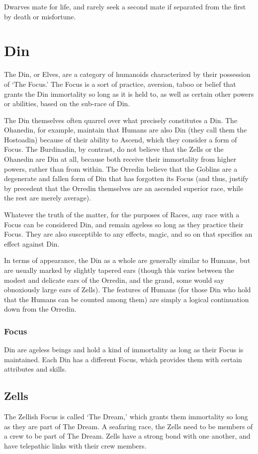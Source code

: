 \documentclass[oneside,11pt,english]{book}
\begin{document}
 
Dwarves mate for life, and rarely seek a second mate if separated from the first by death or misfortune. 
\section{Din}%
The Din, or Elves, are a category of humanoids characterized by their possession of ‘The Focus.’ The 
Focus is a sort of practice, aversion, taboo or belief that grants the Din immortality so long as it is held to, 
as well as certain other powers or abilities, based on the sub-race of Din. 
 

The Din themselves often quarrel over what precisely constitutes a Din. The Ohanedin, for example, 
maintain that Humans are also Din (they call them the Hostoadin) because of their ability to Ascend, 
which they consider a form of Focus. The Burdinadin, by contrast, do not believe that the Zells or the 
Ohanedin are Din at all, because both receive their immortality from higher powers, rather than from 
within. The Orredin believe that the Goblins are a degenerate and fallen form of Din that has forgotten its 
Focus (and thus, justify by precedent that the Orredin themselves are an ascended superior race, while the 
rest are merely average). 

 
Whatever the truth of the matter, for the purposes of Races, any race with a Focus can be considered Din, 
and remain ageless so long as they practice their Focus. They are also susceptible to any effects, magic, 
and so on that specifies an effect against Din. 


In terms of appearance, the Din as a whole are generally similar to Humans, but are usually marked by 
slightly tapered ears (though this varies between the modest and delicate ears of the Orredin, and the 
grand, some would say obnoxiously large ears of Zells). The features of Humans (for those Din who hold 
that the Humans can be counted among them) are simply a logical continuation down from the Orredin. 


\subsubsection{Focus}
Din are ageless beings and hold a kind of immortality as long as their Focus is maintained. Each Din has a 
different Focus, which provides them with certain attributes and skills. 


\subsection{Zells}
The Zellish Focus is called ‘The Dream,’ which grants them immortality so long as they are part of The 
Dream. A seafaring race, the Zells need to be members of a crew to be part of The Dream. Zells have a 
strong bond with one another, and have telepathic links with their crew members. 
\end{document}
